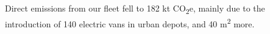 \documentclass[11pt]{article}
\begin{document}
Direct emissions from our fleet fell to 182 kt CO\textsubscript{2}e, mainly due to the
introduction of 140 electric vans in urban depots, and 40 m\textsuperscript{2} more.
\end{document}
